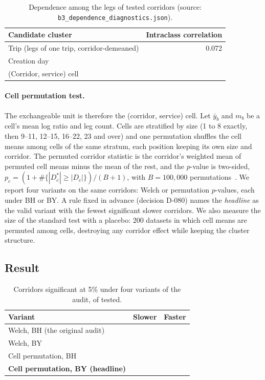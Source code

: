 \ifjournal
\begin{table}[t]
\caption{Dependence among the legs of tested corridors (source: \texttt{b3\_dependence\_diagnostics.json}).}
\label{tab:dependence}
\centering
\begin{tabular}{@{}lr@{}}
\toprule
Candidate cluster & Intraclass correlation \\
\midrule
Trip (legs of one trip, corridor-demeaned) & 0.072 \\
Creation day & \fzDepIccDayDpTwo{} \\
(Corridor, service) cell & \fzDepIccServiceCellDpTwo{} \\
\bottomrule
\end{tabular}
\end{table}
\fi

\paragraph{Cell permutation test.} The exchangeable unit is therefore the (corridor, service) cell. Let $\bar y_b$ and $m_b$ be a cell's mean log ratio and leg count. Cells are stratified by size (1 to 8 exactly, then 9--11, 12--15, 16--22, 23 and over) and one permutation shuffles the cell means among cells of the same stratum, each position keeping its own size and corridor. The permuted corridor statistic is the corridor's weighted mean of permuted cell means minus the mean of the rest, and the $p$-value is two-sided,
$p_c=(1+\#\{|D^{*}_c|\ge|D_c|\})/(B+1)$, with $B=100{,}000$ permutations~\cite{phipson2010permutation}. We report four variants on the same corridors: Welch or permutation $p$-values, each under BH or BY. A rule fixed in advance (decision D-080) names the \emph{headline} as the valid variant with the fewest significant slower corridors. We also measure the size of the standard test with a placebo: 200 datasets in which cell means are permuted among cells, destroying any corridor effect while keeping the cluster structure.

\subsection{Result}
\begin{table}[t]
\caption{Corridors significant at 5\% under four variants of the audit, of \fzCorridorsTested{} tested.}
\label{tab:variants}
\centering
\begin{tabular}{@{}lrr@{}}
\toprule
Variant & Slower & Faster \\
\midrule
Welch, BH (the original audit) & \fzBottlenecks{} & \fzFasterCorridors{} \\
Welch, BY & \fzAuditByWelchSlower{} & \fzAuditByWelchFaster{} \\
Cell permutation, BH & \fzAuditBhPermSlower{} & \fzAuditBhPermFaster{} \\
\textbf{Cell permutation, BY (headline)} & \textbf{\fzAuditRobustHeadlineSlower{}} & \textbf{\fzAuditRobustHeadlineFaster{}} \\
\bottomrule
\end{tabular}
\end{table}

